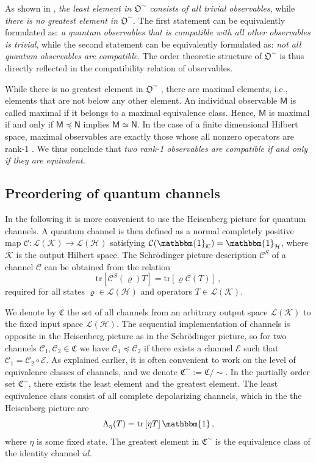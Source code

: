 \documentclass[12pt]{iopart}
\theoremstyle{definition}
\newcommand{\hi}{\mathcal{H}} %
\newcommand{\hik}{\mathcal{K}} %
\newcommand{\lh}{\mathcal{L(H)}} %
\newcommand{\lk}{\mathcal{L(K)}} %
\renewcommand{\tr}[1]{\textrm{tr}\left[#1\right]} %
\newcommand{\id}{\mathbbm{1}} %
\newcommand{\Mo}{\mathsf{M}}%
\newcommand{\No}{\mathsf{N}}%
\newcommand{\chan}{\mathfrak{C}}
\newcommand{\Cc}{\mathcal{C}} %
\newcommand{\pleq}{\preceq}
\newcommand{\obs}{\mathfrak{O}}
\begin{document}
{As shown in \cite{MaMu90a}, \emph{the least element in $\obs^\sim$ consists of all trivial observables}, while \emph{there is no greatest element in $\obs^\sim$}. 
The first statement can be equivalently formulated as: \emph{a quantum observables that is compatible with all other observables is trivial}, while the second statement can be equivalently formulated as: \emph{not all quantum observables are compatible}. 
The order theoretic structure of $\obs^\sim$ is thus directly reflected in the compatibility relation of observables.

While there is no greatest element in $\obs^\sim$ , there are maximal elements, i.e., elements that are not below any other element.
An individual observable $\Mo$ is called maximal if it belongs to a maximal equivalence class. 
Hence, $\Mo$ is maximal if and only if $\Mo \pleq \No$ implies $\Mo\simeq \No$.
In the case of a finite dimensional Hilbert space, maximal observables are exactly those whose all nonzero operators are rank-1 \cite{MaMu90a}.
We thus conclude that \emph{two rank-1 observables are compatible if and only if they are equivalent.}


\subsection{Preordering of quantum channels}
 
In the following it is more convenient to use the Heisenberg picture for quantum channels.
A quantum channel is then defined as a normal completely positive map $\Cc: \lk \to \lh$ satisfying $\Cc(\id_{\hik})=\id_{\hi}$, where $\hik$ is the output Hilbert space. 
The Schr\"odinger picture description $\Cc^S$ of a channel $\Cc$ can be obtained from the relation
\begin{equation}
\tr{\Cc^S(\varrho)T}=\tr{\varrho \Cc(T)} \, , 
\end{equation}
required for all states $\varrho\in\lh$ and operators $T\in\lk$.


We denote by $\chan$ the set of all channels from an arbitrary output space $\lk$ to the fixed input space $\lh$.
The sequential implementation of channels is opposite in the Heisenberg picture as in the Schr\"odinger picture, so for two channels $\Cc_1, \Cc_2\in \chan$ we have $\Cc_1 \pleq \Cc_2$ if there exists a channel $\mathcal{E}$ such that $\Cc_1 =\Cc_2 \circ \mathcal{E}$. 
As explained earlier, it is often convenient to work on the level of equivalence classes of channels, and we denote
$\chan^\sim:=\chan / \sim$. 
In the partially order set $\chan^\sim$, there exists the least element and the greatest element. 
The least equivalence class consist of all complete depolarizing channels, which in the 
the Heisenberg picture are
\begin{equation}
\Lambda_{\eta}(T)=\tr{\eta T}\id \, ,
\end{equation} 
where $\eta$ is some fixed state.
The greatest element in $\chan^\sim$ is the equivalence class of the identity channel $id$. 

}
\end{document}
